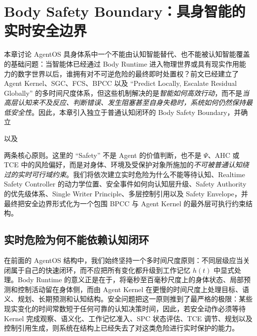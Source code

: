 \chapter{Body Safety Boundary：具身智能的实时安全边界}
\label{chap:body_safety_boundary}

\begin{chapterlead}
本章讨论 AgentOS 具身体系中一个不能由认知智能替代、也不能被认知智能覆盖的基础问题：当智能体已经通过 Body Runtime 进入物理世界或具有现实作用能力的数字世界以后，谁拥有对不可逆危险的最终即时处置权？前文已经建立了 Agent Kernel、SGC、FCS、BPCC 以及 ``Predict Locally, Escalate Residual Globally'' 的多时间尺度体系，但这些机制解决的是\emph{智能如何高效行动}，而不是\emph{当高层认知来不及反应、判断错误、发生阻塞甚至自身失稳时，系统如何仍然保持最低安全性}。因此，本章引入独立于普通认知闭环的 Body Safety Boundary，并确立
\begin{statementbox}
\centering
{}
\end{statementbox}
以及
\begin{statementbox}
\centering
{}
\end{statementbox}
两条核心原则。这里的 ``Safety'' 不是 Agent 的价值判断，也不是 $\Psi$、AHC 或 TCE 中的风险偏好，而是对身体、环境及受保护对象所施加的\emph{不可被普通认知绕过的实时可行域约束}。我们将依次建立实时危险为什么不能等待认知、Realtime Safety Controller 的动力学位置、安全事件如何向认知层升级、Safety Authority 的优先级体系、Single Writer Principle、多层控制引用以及 Safety Envelope，并最终把安全边界形式化为一个包围 BPCC 与 Agent Kernel 的最外层可执行约束结构。
\end{chapterlead}


\section{实时危险为何不能依赖认知闭环}

在前面的 AgentOS 结构中，我们始终坚持一个多时间尺度原则：不同层级应当关闭属于自己的快速闭环，而不应把所有变化都升级到工作记忆 $h(t)$ 中显式处理。Body Runtime 的意义正是在于，将毫秒至百毫秒尺度上的身体状态、局部预测和控制活动留在身体侧，而由 Agent Kernel 在更慢的时间尺度上处理目标、语义、规划、长期预测和认知结构。安全问题把这一原则推到了最严格的极限：某些现实变化的时间常数短于任何可靠的认知决策时间，因此，若安全动作必须等待 Kernel 完成观察、语义化、工作记忆准入、SPC 状态评估、TCE 调节、规划以及控制引用生成，则系统在结构上已经失去了对这类危险进行实时保护的能力。

